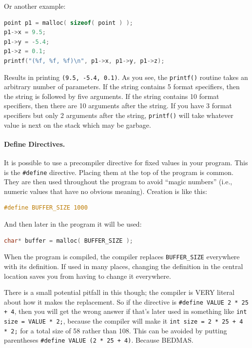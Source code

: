 Or another example:
\begin{lstlisting}[language=C]
point p1 = malloc( sizeof( point ) );
p1->x = 9.5;
p1->y = -5.4;
p1->z = 0.1;
printf("(%f, %f, %f)\n", p1->x, p1->y, p1->z);
\end{lstlisting}

Results in printing \texttt{(9.5, -5.4, 0.1)}. As you see, the \texttt{printf()} routine takes an arbitrary number of parameters. If the string contains 5 format specifiers, then the string is followed by five arguments. If the string contains 10 format specifiers, then there are 10 arguments after the string. If you have 3 format specifiers but only 2 arguments after the string, \texttt{printf()} will take whatever value is next on the stack which may be garbage.

\paragraph{Define Directives.}

It is possible to use a precompiler directive for fixed values in your program. This is the \texttt{\#define} directive. Placing them at the top of the program is common. They are then used throughout the program to avoid ``magic numbers'' (i.e., numeric values that have no obvious meaning). Creation is like this:

\begin{lstlisting}[language=C]
#define BUFFER_SIZE 1000
\end{lstlisting}

And then later in the program it will be used:

\begin{lstlisting}[language=C]
char* buffer = malloc( BUFFER_SIZE );
\end{lstlisting}

When the program is compiled, the compiler replaces \texttt{BUFFER\_SIZE} everywhere with its definition. If used in many places, changing the definition in the central location saves you from having to change it everywhere.

There is a small potential pitfall in this though; the compiler is VERY literal about how it makes the replacement. So if the directive is \texttt{\#define VALUE 2 * 25 + 4}, then you will get the wrong answer if that's later used in something like \texttt{int size = VALUE * 2;}, because the compiler will make it \texttt{int size = 2 * 25 + 4 * 2;} for a total size of 58 rather than 108. This can be avoided by putting parentheses \texttt{\#define VALUE (2 * 25 + 4)}. Because BEDMAS.

